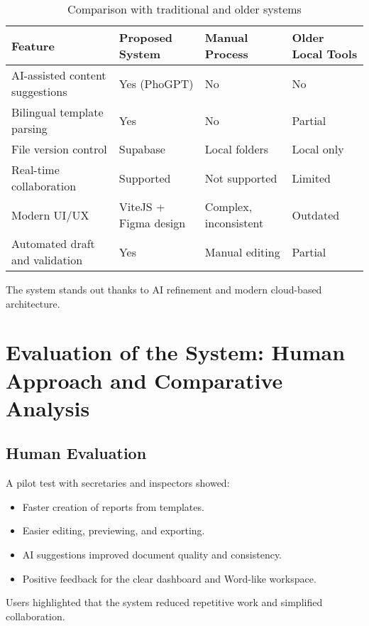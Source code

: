 \begin{table}[h]
\centering
\caption{Comparison with traditional and older systems}
\begin{tabular}{|p{4.5cm}|p{3.5cm}|p{3cm}|p{3cm}|}
\hline
\textbf{Feature} & \textbf{Proposed System} & \textbf{Manual Process} & \textbf{Older Local Tools} \\ \hline
AI-assisted content suggestions & Yes (PhoGPT) & No & No \\ \hline
Bilingual template parsing & Yes & No & Partial \\ \hline
File version control & Supabase & Local folders & Local only \\ \hline
Real-time collaboration & Supported & Not supported & Limited \\ \hline
Modern UI/UX & ViteJS + Figma design & Complex, inconsistent & Outdated \\ \hline
Automated draft and validation & Yes & Manual editing & Partial \\ \hline
\end{tabular}
\end{table}

The system stands out thanks to AI refinement and modern cloud-based architecture.

\section{Evaluation of the System: Human Approach and Comparative Analysis}

\subsection{Human Evaluation}
A pilot test with secretaries and inspectors showed:
\begin{itemize}
    \item Faster creation of reports from templates.
    \item Easier editing, previewing, and exporting.
    \item AI suggestions improved document quality and consistency.
    \item Positive feedback for the clear dashboard and Word-like workspace.
\end{itemize}

Users highlighted that the system reduced repetitive work and simplified collaboration.

